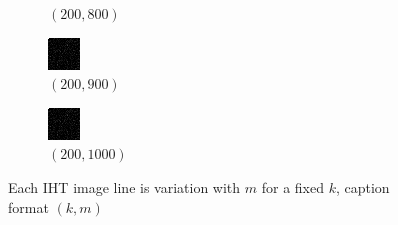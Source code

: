 \documentclass[a4paper, landscape]{article}
\begin{document}
\begin{figure}[H]
\begin{subfigure}{0.09\linewidth}
        \caption*{$(200, 800)$}
    \end{subfigure}
    \begin{subfigure}{0.09\linewidth}
        \centering
        \includegraphics[width=\linewidth]{iht/k = 200, m = 900.png}
        \caption*{$(200, 900)$}
    \end{subfigure}
    \begin{subfigure}{0.09\linewidth}
        \centering
        \includegraphics[width=\linewidth]{iht/k = 200, m = 1000.png}
        \caption*{$(200, 1000)$}
    \end{subfigure}
    \caption{Each IHT image line is variation with $m$ for a fixed $k$, caption format $(k, m)$}
    \label{fig:k}
\end{figure}
\end{document}
